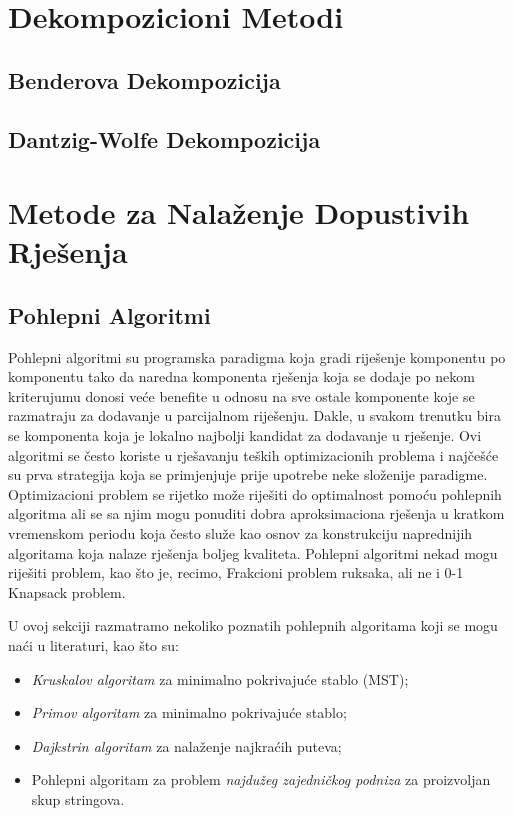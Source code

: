 \documentclass[a4paper, utf8, 11pt, colorlinks]{book}
\begin{document}
 \chapter{Dekompozicioni Metodi}
 
 
 
 \section{Benderova Dekompozicija}
 
  \section{Dantzig-Wolfe Dekompozicija}
 
 \chapter{Metode za Nalaženje Dopustivih Rješenja}

\section{Pohlepni Algoritmi}
 
Pohlepni algoritmi su programska paradigma koja gradi riješenje komponentu po komponentu tako da  naredna komponenta rješenja koja se dodaje po nekom kriterujumu donosi veće benefite u odnosu na sve ostale komponente koje se razmatraju za dodavanje u parcijalnom riješenju. Dakle, u svakom trenutku bira se komponenta koja je lokalno najbolji kandidat za dodavanje u rješenje.  Ovi algoritmi se često koriste u rješavanju teških optimizacionih problema i najčešće su prva strategija koja se primjenjuje prije 
upotrebe neke složenije paradigme. Optimizacioni problem se rijetko može riješiti do optimalnost pomoću pohlepnih algoritma ali se sa njim mogu ponuditi dobra aproksimaciona rješenja u kratkom vremenskom periodu koja često služe kao osnov za konstrukciju naprednijih algoritama koja nalaze  rješenja boljeg kvaliteta. Pohlepni algoritmi nekad mogu riješiti problem, kao što je, recimo, Frakcioni problem ruksaka, ali ne i 0-1 Knapsack problem. 

U ovoj sekciji razmatramo nekoliko poznatih pohlepnih algoritama koji se mogu naći u literaturi, kao što su:
\begin{itemize}
	\item  \emph{Kruskalov algoritam} za minimalno pokrivajuće stablo (MST);
	\item  \emph{Primov algoritam} za minimalno pokrivajuće stablo;
	\item  \emph{Dajkstrin algoritam} za nalaženje najkraćih puteva;
	\item  Pohlepni algoritam za problem \emph{najdužeg zajedničkog podniza} za proizvoljan skup stringova.
\end{itemize}
\end{document}
